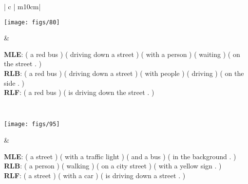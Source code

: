 \begin{table}[H]
\begin{tabular}{ | c | m{10cm}|  }
        \begin{minipage}{.24\textwidth}
      \vspace{2.5mm}
      \texttt{[image: figs/80]}
      \vspace{-2mm}
    \end{minipage}
    &
         $\ $\begin{minipage}{0.95\linewidth}
      {\bf MLE}: ( a red bus ) ( driving down a street ) ( with a person ) ( waiting ) ( on the street . )\\[2mm]
      {\bf  RLB}: ( a red bus ) ( driving down a street ) ( with people ) ( driving ) ( on the side . )\\[2mm]
      {\bf RLF}: ( a red bus ) ( is driving down the street . )
      \end{minipage}

    \\ \hline


        \begin{minipage}{.24\textwidth}
      \vspace{2.5mm}
      \texttt{[image: figs/95]}
      \vspace{-2mm}
    \end{minipage}
    &
            $\ $\begin{minipage}{0.95\linewidth}
      {\bf MLE}: ( a street ) ( with a traffic light ) ( and a bus ) ( in the background . )\\[2mm]
      {\bf  RLB}: ( a person ) ( walking ) ( on a city street ) ( with a yellow sign . )\\[2mm]
      {\bf RLF}: ( a street ) ( with a car ) ( is driving down a street . )
      \end{minipage}
      
    \\ \hline

  \end{tabular}
  \caption{Qualitative examples from our model, and a comparison with baseline models.}\label{tbl:rlexamples}
\end{table}




